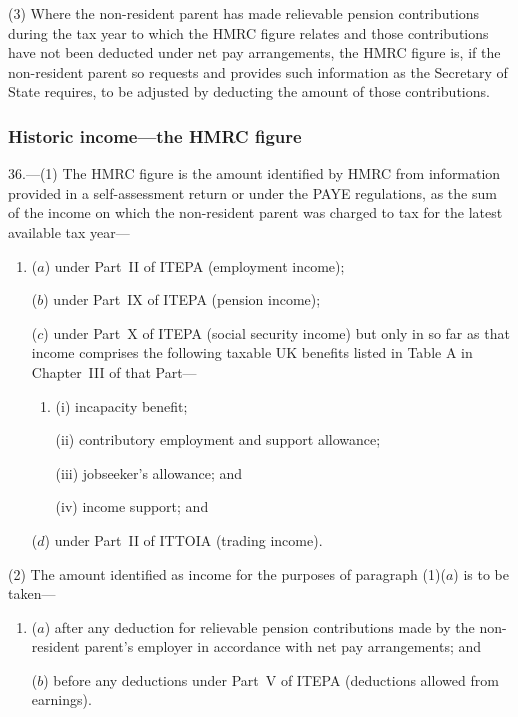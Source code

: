 \documentclass[12pt,a4paper]{article}
\begin{document}
(3) Where the non-resident parent has made relievable pension contributions during the tax year to which the HMRC figure relates and those contributions have not been deducted under net pay arrangements, the HMRC figure is, if the non-resident parent so requests and provides such information as the Secretary of State requires, to be adjusted by deducting the amount of those contributions.

\subsubsection[36. Historic income---the HMRC figure]{Historic income---the HMRC figure}

36.---(1)  The HMRC figure is the amount identified by HMRC from information provided in a self-assessment return or under the PAYE regulations, as the sum of the income on which the non-resident parent was charged to tax for the latest available tax year—
\begin{enumerate}\item[]
($a$) under Part~II of ITEPA (employment income);

($b$) under Part~IX of ITEPA (pension income);

($c$) under Part~X of ITEPA (social security income) but only in so far as that income comprises the following taxable UK benefits listed in Table A in Chapter~III of that Part—
\begin{enumerate}\item[]
(i) incapacity benefit;

(ii) contributory employment and support allowance;

(iii) jobseeker’s allowance; and

(iv) income support; and
\end{enumerate}

($d$) under Part~II of ITTOIA (trading income).
\end{enumerate}

(2) The amount identified as income for the purposes of paragraph (1)($a$)  is to be taken—
\begin{enumerate}\item[]
($a$) after any deduction for relievable pension contributions made by the non-resident parent’s employer in accordance with net pay arrangements; and

($b$) before any deductions under Part~V of ITEPA (deductions allowed from earnings).
\end{enumerate}
\end{document}
